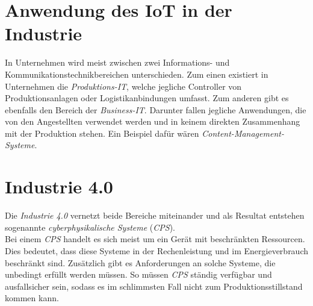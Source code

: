 \documentclass[conference]{IEEEtran}
\begin{document}
\section{Anwendung des IoT in der Industrie}

In Unternehmen wird meist zwischen zwei Informations- und Kommunikationstechnikbereichen unterschieden. Zum einen existiert in Unternehmen die \textit{Produktions-IT}, welche jegliche Controller von Produktionsanlagen oder Logistikanbindungen umfasst. Zum anderen gibt es ebenfalls den Bereich der \textit{Business-IT}. Darunter fallen jegliche Anwendungen, die von den Angestellten verwendet werden und in keinem direkten Zusammenhang mit der Produktion stehen. Ein Beispiel dafür wären \textit{Content-Management-Systeme}.\\

\section{Industrie 4.0}
Die \textit{Industrie 4.0} vernetzt beide Bereiche miteinander und als Resultat entstehen sogenannte \textit{cyberphysikalische Systeme} (\textit{CPS}).\\
Bei einem \textit{CPS} handelt es sich meist um ein Gerät mit beschränkten Ressourcen. Dies bedeutet, dass diese Systeme in der Rechenleistung und im Energieverbrauch beschränkt sind. Zusätzlich gibt es Anforderungen an solche Systeme, die unbedingt erfüllt werden müssen. So müssen \textit{CPS} ständig verfügbar und ausfallsicher sein, sodass es im schlimmsten Fall nicht zum Produktionsstillstand kommen kann.
\end{document}
